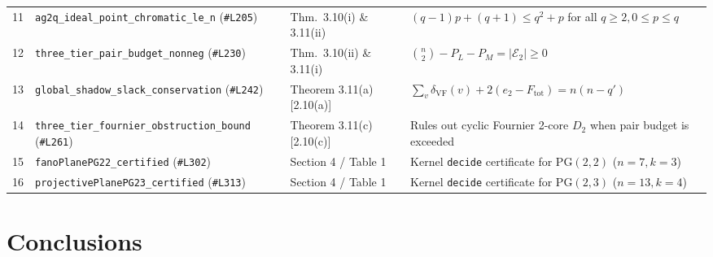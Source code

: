 \documentclass[11pt,reqno]{amsart}
\theoremstyle{definition}
\theoremstyle{remark}
\begin{document}
\begin{table}[htbp]
{\begin{tabular}{clll}
    11 & \texttt{ag2q\_ideal\_point\_chromatic\_le\_n} (\texttt{\#L205}) & Thm.\ 3.10(i) \& 3.11(ii) & $(q - 1)p + (q + 1) \le q^2 + p$ for all $q \ge 2, 0 \le p \le q$ \\
    12 & \texttt{three\_tier\_pair\_budget\_nonneg} (\texttt{\#L230}) & Thm.\ 3.10(ii) \& 3.11(i) & $\binom{n}{2} - P_L - P_M = |\mathcal{E}_2| \ge 0$ \\
    13 & \texttt{global\_shadow\_slack\_conservation} (\texttt{\#L242}) & Theorem 3.11(a) [2.10(a)] & $\sum_v \delta_{\mathrm{VF}}(v) + 2(e_2 - F_{\mathrm{tot}}) = n(n - q')$ \\
    14 & \texttt{three\_tier\_fournier\_obstruction\_bound} (\texttt{\#L261}) & Theorem 3.11(c) [2.10(c)] & Rules out cyclic Fournier 2-core $D_2$ when pair budget is exceeded \\
    15 & \texttt{fanoPlanePG22\_certified} (\texttt{\#L302}) & Section 4 / Table 1 & Kernel \texttt{decide} certificate for $\mathrm{PG}(2,2)$ ($n = 7, k = 3$) \\
    16 & \texttt{projectivePlanePG23\_certified} (\texttt{\#L313}) & Section 4 / Table 1 & Kernel \texttt{decide} certificate for $\mathrm{PG}(2,3)$ ($n = 13, k = 4$) \\
    \bottomrule
  \end{tabular}%
  }
\end{table}

\section{Conclusions}
\end{document}

